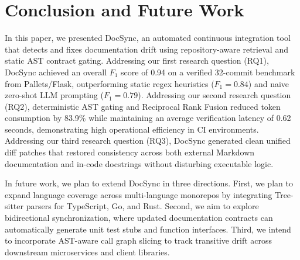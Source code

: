 \documentclass[12pt,onecolumn,draftclsnofoot]{IEEEtran}
\begin{document}
\section{Conclusion and Future Work}
In this paper, we presented DocSync, an automated continuous integration tool that detects and fixes documentation drift using repository-aware retrieval and static AST contract gating. Addressing our first research question (RQ1), DocSync achieved an overall $F_1$ score of 0.94 on a verified 32-commit benchmark from Pallets/Flask, outperforming static regex heuristics ($F_1 = 0.84$) and naive zero-shot LLM prompting ($F_1 = 0.79$). Addressing our second research question (RQ2), deterministic AST gating and Reciprocal Rank Fusion reduced token consumption by 83.9\% while maintaining an average verification latency of 0.62 seconds, demonstrating high operational efficiency in CI environments. Addressing our third research question (RQ3), DocSync generated clean unified diff patches that restored consistency across both external Markdown documentation and in-code docstrings without disturbing executable logic.

In future work, we plan to extend DocSync in three directions. First, we plan to expand language coverage across multi-language monorepos by integrating Tree-sitter parsers for TypeScript, Go, and Rust. Second, we aim to explore bidirectional synchronization, where updated documentation contracts can automatically generate unit test stubs and function interfaces. Third, we intend to incorporate AST-aware call graph slicing to track transitive drift across downstream microservices and client libraries.



\end{document}
